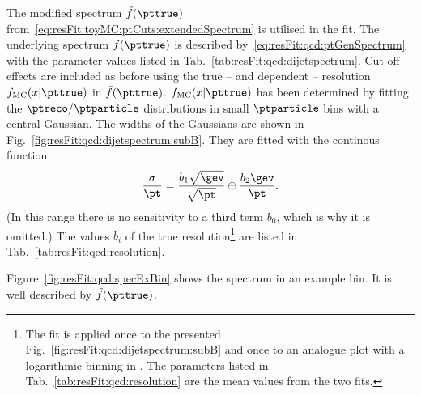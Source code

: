 \documentclass[a4paper]{cmspaper} %
\begin{document}
The modified spectrum $\tilde{f}(\pttrue)$ from~\eqref{eq:resFit:toyMC:ptCuts:extendedSpectrum} is utilised in the fit.
The underlying spectrum $f(\pttrue)$ is described by~\eqref{eq:resFit:qcd:ptGenSpectrum} with the parameter values listed in Tab.~\ref{tab:resFit:qcd:dijetspectrum}.
Cut-off effects are included as before using the true -- and \pt dependent -- resolution $f_{\text{MC}}(x|\pttrue)$ in $\tilde{f}(\pttrue)$.
$f_{\text{MC}}(x|\pttrue)$ has been determined by fitting the $\ptreco/\ptparticle$ distributions in small $\ptparticle$ bins with a central Gaussian.
The widths of the Gaussians are shown in Fig.~\ref{fig:resFit:qcd:dijetspectrum:subB}.
They are fitted with the continous function
\begin{equation}
  \label{eq:resFit:qcd:sigma}
  \frac{\sigma}{\pt} = \frac{b_{1}\sqrt{\gev}}{\sqrt{\pt}} \oplus \frac{b_{2}\gev}{\pt}.
\end{equation}
(In this \pt range there is no sensitivity to a third term $b_{0}$, which is why it is omitted.)
The values $b_{i}$ of the true resolution\footnote{The fit is applied once to the presented Fig.~\ref{fig:resFit:qcd:dijetspectrum:subB} and once to an analogue plot with a logarithmic binning in \ptparticle.
The parameters listed in Tab.~\ref{tab:resFit:qcd:resolution} are the mean values from the two fits.}
are listed in Tab.~\ref{tab:resFit:qcd:resolution}.

Figure~\ref{fig:resFit:qcd:specExBin} shows the \ptparticle spectrum in an example bin.
It is well described by $\tilde{f}(\pttrue)$.
\end{document}
